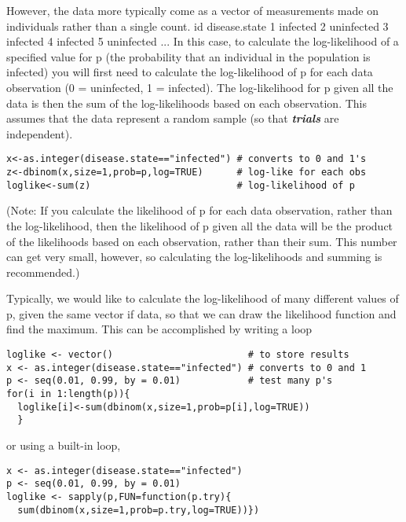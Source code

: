 \documentclass[12pt, a4paper]{article}
\theoremstyle{plain}
\theoremstyle{definition}
\theoremstyle{remark}
\begin{document}
However, the data more typically come as a vector of measurements made on individuals rather than a single count.
id disease.state
1 infected
2 uninfected
3 infected
4 infected
5 uninfected
...
In this case, to calculate the log-likelihood of a specified value for p (the probability that an individual in the population is infected) you will first need to calculate the log-likelihood of p for each data observation (0 = uninfected, 1 = infected). The log-likelihood for p given all the data is then the sum of the log-likelihoods based on each observation. This assumes that the data represent a random sample (so that \textbf{\textit{trials}} are independent).

\begin{framed}
\begin{verbatim}
x<-as.integer(disease.state=="infected") # converts to 0 and 1's
z<-dbinom(x,size=1,prob=p,log=TRUE)      # log-like for each obs
loglike<-sum(z)                          # log-likelihood of p
\end{verbatim}
\end{framed}

(Note: If you calculate the likelihood of p for each data observation, rather than the log-likelihood, then the likelihood of p given all the data will be the product of the likelihoods based on each observation, rather than their sum. This number can get very small, however, so calculating the log-likelihoods and summing is recommended.)

Typically, we would like to calculate the log-likelihood of many different values of p, given the same vector if data, so that we can draw the likelihood function and find the maximum. This can be accomplished by writing a loop
\begin{framed}
\begin{verbatim}
loglike <- vector()                        # to store results
x <- as.integer(disease.state=="infected") # converts to 0 and 1
p <- seq(0.01, 0.99, by = 0.01)            # test many p's
for(i in 1:length(p)){
  loglike[i]<-sum(dbinom(x,size=1,prob=p[i],log=TRUE))
  }
\end{verbatim}
\end{framed}

or using a built-in loop,
\begin{framed}
\begin{verbatim}
x <- as.integer(disease.state=="infected")
p <- seq(0.01, 0.99, by = 0.01)
loglike <- sapply(p,FUN=function(p.try){
  sum(dbinom(x,size=1,prob=p.try,log=TRUE))})
\end{verbatim}
\end{framed}
\end{document}
